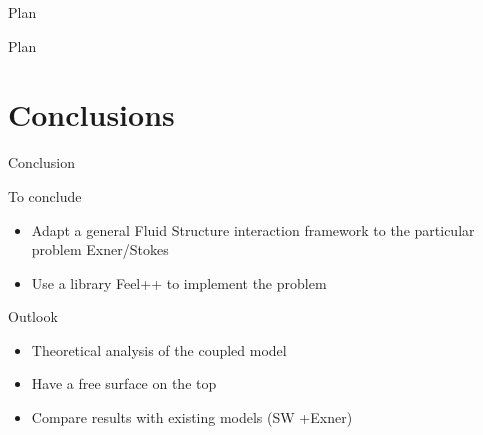 \documentclass[notes]{beamer}
\begin{document}
\begin{frame}{Plan}
  \tableofcontents
\end{frame}



\begin{frame}{Plan}
  \tableofcontents
\end{frame}


\section{Conclusions}
\begin{frame}{Conclusion}

\begin{block}{To conclude}
\begin{itemize}
\item Adapt a general Fluid Structure interaction framework to the particular problem Exner/Stokes
\item Use a library Feel++ to implement the problem
\end{itemize}
\end{block}

\begin{block}{Outlook}
\begin{itemize}
\item Theoretical analysis of the coupled model 
\item Have a free surface on the top
\item Compare results with existing models (SW +Exner)
\end{itemize}
\end{block}


\end{frame}
\end{document}
